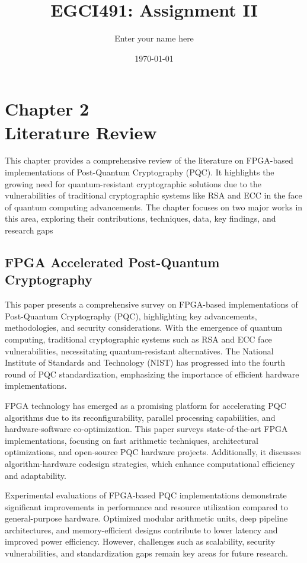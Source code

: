 \documentclass[a4paper, 12pt]{report}
\title{EGCI491: Assignment II}
\author{Enter your name here} %
\date{\today}
\begin{document}
	
	\maketitle
	
	\chapter*{\centering Chapter 2 \\  Literature Review}
	
	\hspace{\parindent} 
	This chapter provides a comprehensive review of the literature on FPGA-based implementations of Post-Quantum Cryptography (PQC). It highlights the growing need for quantum-resistant cryptographic solutions due to the vulnerabilities of traditional cryptographic systems like RSA and ECC in the face of quantum computing advancements. The chapter focuses on two major works in this area, exploring their contributions, techniques, data, key findings, and research gaps
	
	\setcounter{chapter}{2}
	\section{ FPGA Accelerated Post-Quantum Cryptography \cite{paper_1}}
	This paper presents a comprehensive survey on FPGA-based implementations of Post-Quantum Cryptography (PQC), highlighting key advancements, methodologies, and security considerations. With the emergence of quantum computing, traditional cryptographic systems such as RSA and ECC face vulnerabilities, necessitating quantum-resistant alternatives. The National Institute of Standards and Technology (NIST) has progressed into the fourth round of PQC standardization, emphasizing the importance of efficient hardware implementations.
	
	FPGA technology has emerged as a promising platform for accelerating PQC algorithms due to its reconfigurability, parallel processing capabilities, and hardware-software co-optimization. This paper surveys state-of-the-art FPGA implementations, focusing on fast arithmetic techniques, architectural optimizations, and open-source PQC hardware projects. Additionally, it discusses algorithm-hardware codesign strategies, which enhance computational efficiency and adaptability.
	
	Experimental evaluations of FPGA-based PQC implementations demonstrate significant improvements in performance and resource utilization compared to general-purpose hardware. Optimized modular arithmetic units, deep pipeline architectures, and memory-efficient designs contribute to lower latency and improved power efficiency. However, challenges such as scalability, security vulnerabilities, and standardization gaps remain key areas for future research.
	
\end{document}
